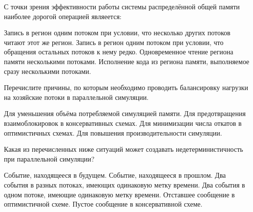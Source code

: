 \begin{questions}
\question[3] С точки зрения эффективности работы системы распределённой общей памяти наиболее дорогой операцией являеется:
\begin{choices}
    \correctchoice Запись в регион одним потоком при условии, что несколько других потоков читают этот же регион.
    \choice Запись в регион одним потоком при условии, что обращения остальных потоков к нему редко.
    \choice Одновременное чтение региона памяти несколькими потоками.
    \choice Исполнение кода из региона памяти, выполняемое сразу несколькими потоками.
\end{choices}

\question[3] Перечислите причины, по которым необходимо проводить балансировку нагрузки на хозяйские потоки в параллельной симуляции.
\begin{choices}
    \choice Для уменьшения объёма потребляемой симуляцией памяти.
    \choice Для предотвращения взаимоблокировок в консервативных схемах.
    \choice Для минимизации числа откатов в оптимистичных схемах.
    \correctchoice Для повышения производительности симуляции.
\end{choices}

\question[3] Какая из перечисленных ниже ситуаций может создавать недетерминистичность при параллельной симуляции?
\begin{choices}
    \choice Событие, находящееся в будущем.
    \choice Событие, находящееся в прошлом.
    \choice Два события в разных потоках, имеющих одинаковую метку времени.
    \correctchoice Два события в одном  потоке, имеющие одинаковую метку времени.
    \choice Отставшее сообщение в оптимистичной схеме.
    \choice Пустое сообщение в консервативной схеме.
\end{choices}


\end{questions}

